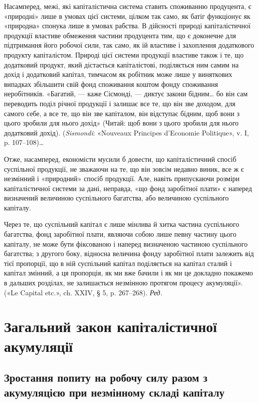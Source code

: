 {Насамперед, межі, які капіталістична система ставить споживанню
продуцента, є «природні» лише в умовах цієї системи, цілком так
само, як батіг функціонує як «природна» спонука лише в умовах рабства.
В дійсності природі капіталістичної продукції властиве обмеження
частини продуцента тим, що є доконечне для підтримання його робочої
сили, так само, як ій властиве і захоплення додаткового продукту
капіталістом. Природі цієї системи продукції властиве також і те, що
додатковий продукт, який дістається капіталістові, поділяється ним
самим на дохід і додатковий капітал, тимчасом як робітник може лише
у виняткових випадках збільшити свій фонд споживання коштом фонду
споживання неробітників. «Багатий, — каже Сісмонді, — диктує закони
бідним\dots{} бо він сам переводить поділ річної продукції і залишає все
те, що він зве доходом, для самого себе, а все те, що він зве капіталом,
він відступає бідним, щоб вони з цього зробили для нього дохід» (Читай:
щоб вони з цього зробили для нього додатковий дохід). (\emph{Sismondi}: «Nouveaux
Principes d’Economie Politique», v. I, p. 107--108)\dots{}

Отже, насамперед, економісти мусили б довести, що капіталістичний
спосіб суспільної продукції, не зважаючи на те, що він зовсім
недавно виник, все ж є незмінний і «природний» спосіб продукції. Але,
навіть припускаючи розміри капіталістичної системи за дані, неправда,
«що фонд заробітної плати» є наперед визначений величиною суспільного
багатства, або величиною суспільного капіталу.

Через те, що суспільний капітал є лише мінлива й хитка частина
суспільного багатства, фонд заробітної плати, являючи собою лише
певну частину цього капіталу, не може бути фіксованою і наперед визначеною
частиною суспільного багатства; з другого боку, відносна величина
фонду заробітної плати залежить від тієї пропорції, що в ній суспільний
капітал поділяється на капітал сталий і капітал змінний, а ця
пропорція, як ми вже бачили і як ми це докладно покажемо в дальших
розділах, не залишається незмінною протягом процесу акумуляції».
(«Le Capital etc.», ch. XXIV, § 5, p. 267--268). \emph{Ред.}
}


\section{Загальний закон капіталістичної акумуляції}

\subsection{Зростання попиту на робочу силу разом з акумуляцією
при незмінному складі капіталу}

